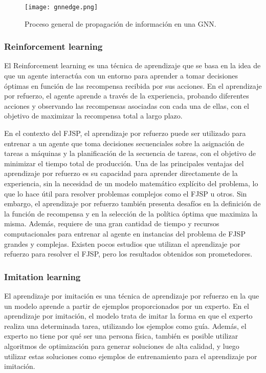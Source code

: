 \begin{figure}[ht]
      \centering
      \texttt{[image: gnnedge.png]}
      \caption{Proceso general de propagación de información en una GNN\cite{DeepFindr_2021}.}\label{fig:gnn-edge}
\end{figure}

\subsubsection{Reinforcement learning}
El Reinforcement learning\cite{Bhatt_2018}\cite{Huggingface_DeepRL} es una
técnica de aprendizaje que se basa en la idea de que un agente interactúa con
un entorno para aprender a tomar decisiones óptimas en función de las
recompensa recibida por sus acciones. En el aprendizaje por refuerzo, el agente
aprende a través de la experiencia, probando diferentes acciones y observando
las recompensas asociadas con cada una de ellas, con el objetivo de maximizar
la recompensa total a largo plazo.\medskip

En el contexto del FJSP, el aprendizaje por refuerzo puede ser utilizado para
entrenar a un agente que toma decisiones secuenciales sobre la asignación de
tareas a máquinas y la planificación de la secuencia de tareas, con el objetivo
de minimizar el tiempo total de producción. Una de las principales ventajas del
aprendizaje por refuerzo es su capacidad para aprender directamente de la
experiencia, sin la necesidad de un modelo matemático explícito del problema,
lo que lo hace útil para resolver problemas complejos como el FJSP u otros. Sin
embargo, el aprendizaje por refuerzo también presenta desafíos en la definición
de la función de recompensa y en la selección de la política óptima que
maximiza la misma. Además, requiere de una gran cantidad de tiempo y recursos
computacionales para entrenar al agente en instancias del problema de FJSP
grandes y complejas. Existen pocos estudios que utilizan el aprendizaje por
refuerzo para resolver el FJSP, pero los resultados obtenidos son prometedores.

\subsubsection{Imitation learning}
El aprendizaje por imitación es una técnica de aprendizaje por refuerzo en la
que un modelo aprende a partir de ejemplos proporcionados por un experto. En el
aprendizaje por imitación, el modelo trata de imitar la forma en que el experto
realiza una determinada tarea, utilizando los ejemplos como guía. Además, el
experto no tiene por qué ser una persona física, también es posible utilizar
algoritmos de optimización para generar soluciones de alta calidad, y luego
utilizar estas soluciones como ejemplos de entrenamiento para el aprendizaje
por imitación.\medskip

